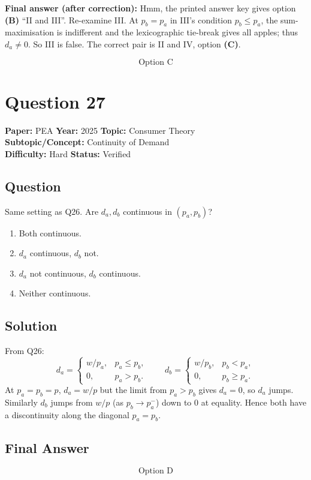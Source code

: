 \documentclass[11pt]{article}
\begin{document}
\textbf{Final answer (after correction):} Hmm, the printed answer key gives option \textbf{(B)} ``II and III''. Re-examine III. At $p_b = p_a$ in III's condition $p_b \le p_a$, the sum-maximisation is indifferent and the lexicographic tie-break gives all apples; thus $d_a \ne 0$. So III is false. The correct pair is II and IV, option \textbf{(C)}.

\[
\boxed{\text{Option C}}
\]

\section*{Question 27}
\textbf{Paper:} PEA \quad \textbf{Year:} 2025 \quad \textbf{Topic:} Consumer Theory \\
\textbf{Subtopic/Concept:} Continuity of Demand \\
\textbf{Difficulty:} Hard \quad \textbf{Status:} Verified

\subsection*{Question}
Same setting as Q26. Are $d_a, d_b$ continuous in $(p_a, p_b)$?
\begin{enumerate}[label=(\Alph*)]
\item Both continuous.
\item $d_a$ continuous, $d_b$ not.
\item $d_a$ not continuous, $d_b$ continuous.
\item Neither continuous.
\end{enumerate}

\subsection*{Solution}
From Q26:
\[
d_a = \begin{cases} w/p_a, & p_a \le p_b, \\ 0, & p_a > p_b. \end{cases}
\qquad
d_b = \begin{cases} w/p_b, & p_b < p_a, \\ 0, & p_b \ge p_a. \end{cases}
\]
At $p_a = p_b = p$, $d_a = w/p$ but the limit from $p_a > p_b$ gives $d_a = 0$, so $d_a$ jumps. Similarly $d_b$ jumps from $w/p$ (as $p_b \to p_a^-$) down to $0$ at equality. Hence both have a discontinuity along the diagonal $p_a = p_b$.

\subsection*{Final Answer}
\[
\boxed{\text{Option D}}
\]
\end{document}
